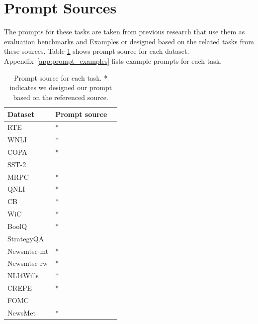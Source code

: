 \documentclass[letterpaper]{article} %
\begin{document}
\section{Prompt Sources}
The prompts for these tasks are taken from previous research \cite{Bang2023, Qin2023} that use them as evaluation benchmarks and \citet{openai2023b} Examples or designed based on the related tasks from these sources. Table \ref{fig-prompt-source-llm} shows prompt source for each dataset.  Appendix~\ref{app:prompt_examples} lists example prompts for each task.


\begin{table}[h!]
\centering \small
\begin{tabular}{l||ll}
Dataset & Prompt source  \\ \hline \hline
RTE &  \citet{Bang2023}* \\
WNLI &  \citet{Bang2023}* \\
COPA &  \citet{Bang2023}*\\
SST-2 & \citet{openai2023b}\\
MRPC &  \citet{openai2023b}*  \\
QNLI &  \citet{Bang2023}* \\
CB &  \citet{Bang2023}*\\
WiC &  \citet{openai2023b}* \\
BoolQ &  \citet{Qin2023}* \\
\hline \hline
StrategyQA &   \citet{Qin2023} \\
Newsmtsc-mt & \citet{openai2023b}* \\
Newsmtsc-rw & \citet{openai2023b}* \\
NLI4Wills &  \citet{Bang2023}* \\
CREPE &   \citet{openai2023b}* \\
FOMC &  \citet{shah2023} \\
NewsMet& \citet{Bang2023}*
\end{tabular}
\caption[]{Prompt source for each task. * indicates we designed our prompt based on the referenced source.}
\label{fig-prompt-source-llm}
\end{table}
\end{document}
